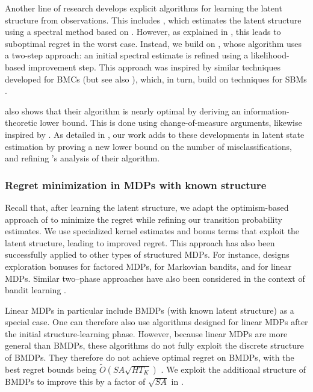 \documentclass[11pt]{article}
\theoremstyle{definition}
\theoremstyle{definition}
\begin{document}
Another line of research develops explicit algorithms for learning the latent structure from observations.
This includes \cite{azizzadenesheli2016reinforcement}, which estimates the latent structure using a spectral method based on \cite{JMLR:v15:anandkumar14b}.
However, as explained in , this leads to suboptimal regret in the worst case.
Instead, we build on \cite{Jedra:2022}, whose algorithm uses a two-step approach: an initial spectral estimate is refined using a likelihood-based improvement step.
This approach was inspired by similar techniques developed for \glspl{BMC} \cite{Sanders:2020} (but see also \cite{10.5555/3454287.3454690,8918022,zhu2022learning,van2024estimating}), which, in turn, build on techniques for \glspl{SBM} \cite{yun2014community,yun2016optimal}.

\cite{Jedra:2022} also shows that their algorithm is nearly optimal by deriving an information-theoretic lower bound.
This is done using change-of-measure arguments, likewise inspired by \cite{Sanders:2020,yun2014community,yun2016optimal}.
As detailed in , our work adds to these developments in latent state estimation by proving a new lower bound on the number of misclassifications, and refining \cite{Jedra:2022}'s analysis of their algorithm.

\subsubsection{Regret minimization in \texorpdfstring{\glspl{MDP}}{MDPs} with known structure}

Recall that, after learning the latent structure, we adapt the optimism-based approach of \cite{UCRLVI} to minimize the regret while refining our transition probability estimates.
We use specialized kernel estimates and bonus terms that exploit the latent structure, leading to improved regret.
This approach has also been successfully applied to other types of structured \glspl{MDP}.
For instance, \cite{NEURIPS2020_e61eaa38} designs exploration bonuses for factored \glspl{MDP}, \cite{gast2022reinforcement} for Markovian bandits, and \cite{pmlr-v125-jin20a} for linear \glspl{MDP}.
Similar two--phase approaches have also been considered in the context of bandit learning \cite{pmlr-v32-gentile14,gopalan2016lowrank,jedra2024low}.

Linear \glspl{MDP} in particular include \glspl{BMDP} (with known latent structure) as a special case.
One can therefore also use algorithms designed for linear \glspl{MDP} after the initial structure-learning phase.
However, because linear \glspl{MDP} are more general than \glspl{BMDP}, these algorithms do not fully exploit the discrete structure of \glspl{BMDP}.
They therefore do not achieve optimal regret on \glspl{BMDP}, with the best regret bounds being $\tilde{O}(SA\sqrt{HT_K})$ \cite{he2023nearly, agarwal2023vo,hu2022nearly}.
We exploit the additional structure of \glspl{BMDP} to improve this by a factor of $\sqrt{SA}$ in .
\end{document}
